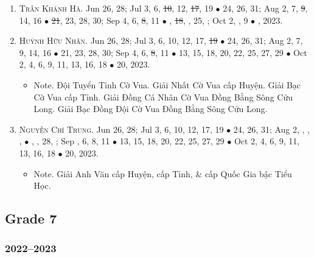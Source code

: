\documentclass{article}
\begin{document}
\begin{enumerate}
	\item \textsc{Trần Khánh Hà.} {\sf[In]} Jun 26, 28; Jul 3, 6, \st{10}, 12, \st{17}, 19 $\bullet$ 24, 26, 31; Aug 2, 7, \st{9}, 14, 16 $\bullet$ \st{21}, 23, 28, 30; Sep 4, 6, \st{8}, 11 $\bullet$ , \st{18}, , 25, ; Oct 2, , 9 $\bullet$ , 2023.
	\item \textsc{Huỳnh Hữu Nhân.} {\sf[In]} Jun 26, 28; Jul 3, 6, 10, 12, 17, \st{19} $\bullet$ 24, 26, 31; Aug 2, 7, 9, 14, 16 $\bullet$ 21, 23, 28, 30; Sep 4, 6, \st{8}, 11 $\bullet$ 13, 15, 18, 20, 22, 25, 27, 29 $\bullet$ Oct 2, 4, 6, 9, 11, 13, 16, 18 $\bullet$ 20, 2023.
	\begin{itemize}
		\item {\sf Note.} Đội Tuyển Tỉnh Cờ Vua. Giải Nhất Cờ Vua cấp Huyện. Giải Bạc Cờ Vua cấp Tỉnh. Giải Đồng Cá Nhân Cờ Vua Đồng Bằng Sông Cửu Long. Giải Bạc Đồng Đội Cờ Vua Đồng Bằng Sông Cửu Long.
	\end{itemize}
	\item \textsc{Nguyễn Chí Trung.} {\sf[In]} Jun 26, 28; Jul 3, 6, 10, 12, 17, 19 $\bullet$ 24, 26, 31; Aug 2, , , ,  $\bullet$ , , 28, ; Sep , 6, 8, 11 $\bullet$ 13, 15, 18, 20, 22, 25, 27, 29 $\bullet$ Oct 2, 4, 6, 9, 11, 13, 16, 18 $\bullet$ 20, 2023.
	\begin{itemize}
		\item {\sf Note.} Giải Anh Văn cấp Huyện, cấp Tỉnh, \& cấp Quốc Gia bậc Tiểu Học.
	\end{itemize}
\end{enumerate}


\subsection{Grade 7}

\subsubsection{2022--2023}
\end{document}

